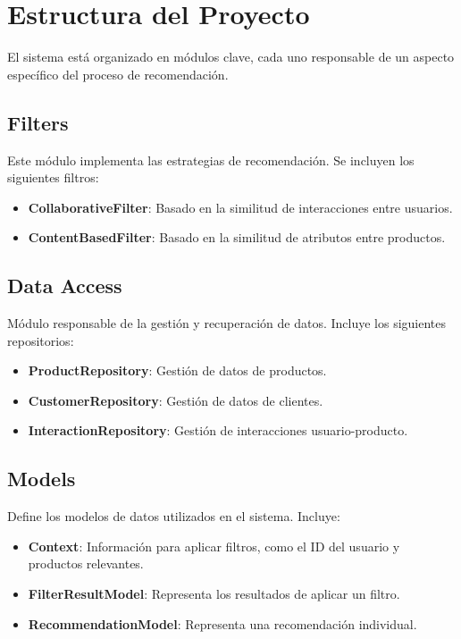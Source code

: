 \documentclass{llncs}
\begin{document}
\section{Estructura del Proyecto}
El sistema está organizado en módulos clave, cada uno responsable de un aspecto específico del proceso de recomendación.

\subsection{Filters}
Este módulo implementa las estrategias de recomendación. Se incluyen los siguientes filtros:

\begin{itemize}
    \item \textbf{CollaborativeFilter}: Basado en la similitud de interacciones entre usuarios.
    \item \textbf{ContentBasedFilter}: Basado en la similitud de atributos entre productos.
\end{itemize}

\subsection{Data Access}
Módulo responsable de la gestión y recuperación de datos. Incluye los siguientes repositorios:

\begin{itemize}
    \item \textbf{ProductRepository}: Gestión de datos de productos.
    \item \textbf{CustomerRepository}: Gestión de datos de clientes.
    \item \textbf{InteractionRepository}: Gestión de interacciones usuario-producto.
\end{itemize}

\subsection{Models}
Define los modelos de datos utilizados en el sistema. Incluye:

\begin{itemize}
    \item \textbf{Context}: Información para aplicar filtros, como el ID del usuario y productos relevantes.
    \item \textbf{FilterResultModel}: Representa los resultados de aplicar un filtro.
    \item \textbf{RecommendationModel}: Representa una recomendación individual.
\end{itemize}
\end{document}
